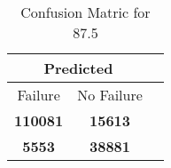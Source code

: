 \begin{table}[] 
\label{Table: Prediction Accuracy-DMD87.5OnlySunEKF-resetReflection-Reflection} 
\caption{Confusion Matric for 87.5} 
\centering 
\begin{tabular} 
 {@{}ccc@{}} 
\toprule 
\multicolumn{2}{c}{\textbf{Predicted}}
 \\ \midrule 
\multicolumn{1}{|c|}{Failure} & 
\multicolumn{1}{c|}{No Failure}
 \\ \midrule 
\multicolumn{1}{|c|}{\color{green}\textbf{110081}} & 
\multicolumn{1}{c|}{\color{red}\textbf{15613}}
 \\ \midrule 
\multicolumn{1}{|c|}{\color{red}\textbf{5553}} & 
\multicolumn{1}{c|}{\color{green}\textbf{38881}}
 \\ \bottomrule 
\end{tabular} 
\end{table} 
